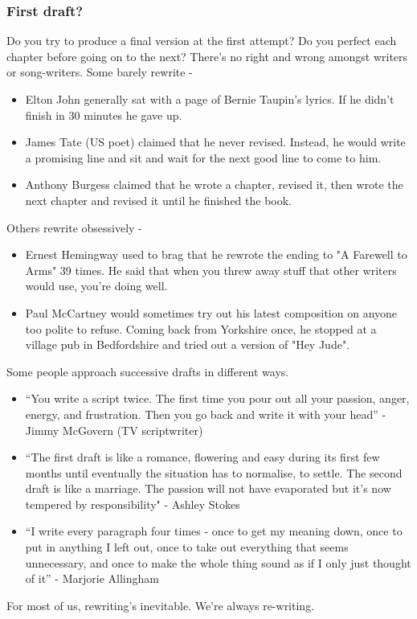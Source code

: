 \documentclass[11pt]{article}
\begin{document}
\subsubsection*{First draft?}
Do you try to produce a final version at the first attempt? Do you perfect each chapter before going on to the next? There's no right and wrong amongst writers or song-writers. Some barely rewrite -
\begin{itemize}
\item Elton John generally sat with a page of Bernie Taupin's lyrics. If he didn't
finish in 30 minutes he gave up.

\item James Tate (US poet) claimed that he never revised. Instead, he would write a promising line and sit and wait for the next good line to come to him.

\item Anthony Burgess claimed that he wrote a chapter, revised it, then wrote the next chapter and revised it until he finished the book. 
\end{itemize}

Others rewrite obsessively -
\begin{itemize}
\item Ernest Hemingway  used to brag that he rewrote the ending to "A Farewell to Arms" 39 times. He said that when you threw away stuff that other writers would use, you're doing well.

\item Paul McCartney would sometimes try out his latest composition on anyone too polite to refuse. Coming back from Yorkshire once, he stopped at a village pub in Bedfordshire and tried out a version of "Hey Jude".
\end{itemize}

Some people approach successive drafts in different ways.
\begin{itemize}
\item  ``You write a script twice. The first time you pour out all your passion, anger, energy, and frustration. Then you go back and write it with your head'' - Jimmy McGovern (TV scriptwriter)

\item  ``The first draft is like a romance, flowering and easy during its first few months until eventually the situation has to normalise, to settle. The second draft is like a marriage. The passion will not have evaporated but it’s now tempered by responsibility" - Ashley Stokes
\item  ``I write every paragraph four times - once to get my meaning down, once to put in anything I left out, once to take out everything that seems unnecessary, and once to make the whole thing sound as if I only just thought of it'' - Marjorie Allingham 
\end{itemize}
For most of us, rewriting's inevitable. We're always re-writing.
\end{document}
